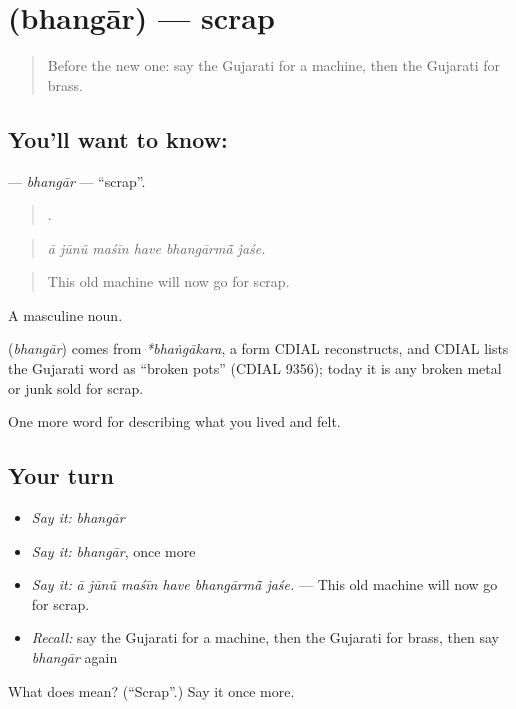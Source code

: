 \section[\texorpdfstring{\gu{ભંગાર} (bhangār)}{ભંગાર (bhangār)}]{ (bhangār) — scrap}

\label{lesson:GU-C513-bhangar}



\begin{quote}
Before the new one: say the Gujarati for a machine, then the Gujarati for brass.
\end{quote}

\subsection*{You'll want to know: }
\textbf{} — \emph{bhangār} — \textquotedblleft{}scrap\textquotedblright{}.

\begin{quote}
     .
\end{quote}

\begin{quote}
\emph{ā jūnũ maśīn have bhangārmā̃ jaśe.}
\end{quote}

\begin{quote}
This old machine will now go for scrap.
\end{quote}

A masculine noun.

\begin{cousinweb}
\textbf{} (\emph{bhangār}) comes from \emph{*bhaṅgākara}, a form CDIAL reconstructs, and CDIAL lists the Gujarati word as \textquotedblleft{}broken pots\textquotedblright{} (CDIAL 9356); today it is any broken metal or junk sold for scrap.
\end{cousinweb}

\begin{grammarlens}[title={What you've built}]
One more word for describing what you lived and felt.
\end{grammarlens}

\subsection*{Your turn}
\begin{itemize}
\raggedright
  \item \emph{Say it:} \emph{bhangār}
  \item \emph{Say it:} \emph{bhangār}, once more
  \item \emph{Say it:} \emph{ā jūnũ maśīn have bhangārmā̃ jaśe.} — This old machine will now go for scrap.
  \item \emph{Recall:} say the Gujarati for a machine, then the Gujarati for brass, then say \emph{bhangār} again
\end{itemize}

\begin{tcolorbox}[breakable,colback=teal!4,colframe=teal!35!black,title={Before you move on}]
What does  mean? (\textquotedblleft{}Scrap\textquotedblright{}.) Say it once more.
\end{tcolorbox}
